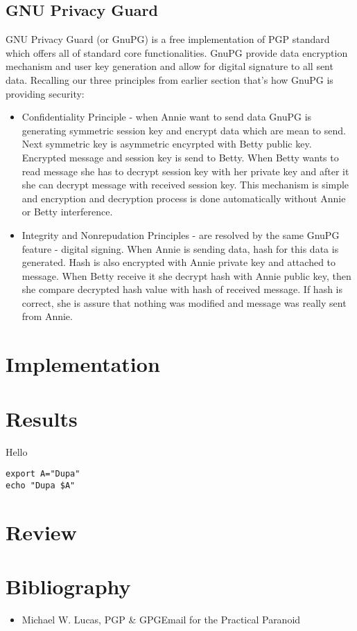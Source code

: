 \documentclass{classrep}
\begin{document}
\subsection{GNU Privacy Guard}

GNU Privacy Guard (or GnuPG) is a free implementation of PGP standard which offers all of standard core functionalities. GnuPG provide data encryption mechanism and user key generation and allow for digital signature to all sent data.
\newline
Recalling our three principles from earlier section that's how GnuPG is providing security:
\begin{itemize}
\item Confidentiality Principle - when Annie want to send data GnuPG is generating symmetric session key and encrypt data which are mean to send. Next symmetric key is asymmetric encyrpted with Betty public key. Encrypted message and session key is send to Betty. When Betty wants to read message she has to decrypt session key with her private key and after it she can decrypt message with received session key. This mechanism is simple and encryption and decryption process is done automatically without Annie or Betty interference.

\item Integrity and Nonrepudation Principles - are resolved by the same GnuPG feature - digital signing. When Annie is sending data, hash for this data is generated. Hash is also encrypted with Annie private key and attached to message. When Betty receive it she decrypt hash with Annie public key, then she compare decrypted hash value with hash of received message. If hash is correct, she is assure that nothing was modified and message was really sent from Annie.
\end{itemize}

\section{Implementation}

\section{Results}

Hello
\begin{lstlisting}[label={lst:consistent_conflicting_code}, caption={Fragment}]
export A="Dupa"
echo "Dupa $A"
\end{lstlisting}

\section{Review}

\section{Bibliography}
\begin{itemize}
\item Michael W. Lucas, PGP \& GPGEmail for the Practical Paranoid
\end{itemize}
\end{document}
